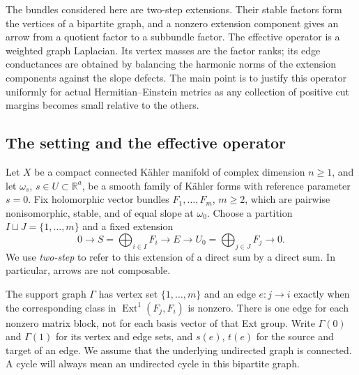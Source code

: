 \documentclass[11pt]{amsart}
\theoremstyle{definition}
\theoremstyle{remark}
\newcommand{\Ext}{\operatorname{Ext}}
\newcommand{\RR}{\mathbb R}
\begin{document}
The bundles considered here are two-step extensions. Their stable
factors form the vertices of a bipartite graph, and a nonzero extension
component gives an arrow from a quotient factor to a subbundle factor.
The effective operator is a weighted graph Laplacian. Its vertex
masses are the factor ranks; its edge conductances are obtained by
balancing the harmonic norms of the extension components against the
slope defects. The main point is to justify this operator uniformly
for actual Hermitian--Einstein metrics as any collection of positive
cut margins becomes small relative to the others.

\subsection{The setting and the effective operator}

Let \(X\) be a compact connected Kähler manifold of complex dimension
\(n\geq1\), and let \(\omega_s\), \(s\in U\subset\RR^a\), be a smooth
family of Kähler forms with reference parameter \(s=0\).
Fix holomorphic vector bundles \(F_1,\ldots,F_m\), \(m\geq2\), which
are pairwise nonisomorphic, stable, and of equal slope at \(\omega_0\).
Choose a partition \(I\sqcup J=\{1,\ldots,m\}\) and a fixed extension
\begin{equation}\label{eq01:extension}
 0\longrightarrow S=\bigoplus_{i\in I}F_i
 \longrightarrow E
 \longrightarrow U_0=\bigoplus_{j\in J}F_j
 \longrightarrow0.
\end{equation}
We use \emph{two-step} to refer to this extension of a direct sum by a
direct sum. In particular, arrows are not composable.

The support graph \(\Gamma\) has vertex set \(\{1,\ldots,m\}\) and an
edge \(e:j\to i\) exactly when the corresponding class in
\(\Ext^1(F_j,F_i)\) is nonzero. There is one edge for each nonzero
matrix block, not for each basis vector of that Ext group.
Write \(\Gamma(0)\) and \(\Gamma(1)\) for its vertex and edge sets,
and \(s(e)\), \(t(e)\) for the source and target of an edge.
We assume that the underlying undirected graph is connected.
A cycle will always mean an undirected cycle in this bipartite graph.
\end{document}
